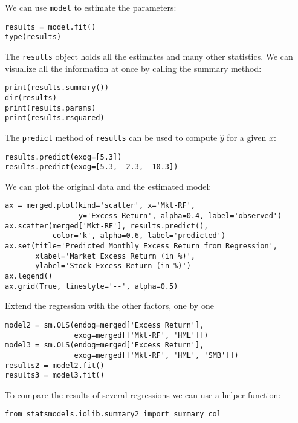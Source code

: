 \documentclass[12pt, a4paper]{article}
\begin{document}
We can use \texttt{model} to estimate the parameters:
\lstset{language=jupyter-python,label= ,caption= ,captionpos=b,numbers=none}
\begin{lstlisting}
results = model.fit()
type(results)
\end{lstlisting}

The \texttt{results} object holds all the estimates and many other statistics.
We can visualize all the information at once by calling the summary method:
\lstset{language=jupyter-python,label= ,caption= ,captionpos=b,numbers=none}
\begin{lstlisting}
print(results.summary())
dir(results)
print(results.params)
print(results.rsquared)
\end{lstlisting}

The \texttt{predict} method of \texttt{results} can be used to compute \(\hat{y}\) for a given \(x\):
\lstset{language=jupyter-python,label= ,caption= ,captionpos=b,numbers=none}
\begin{lstlisting}
results.predict(exog=[5.3])
results.predict(exog=[5.3, -2.3, -10.3])
\end{lstlisting}

We can plot the original data and the estimated model:
\lstset{language=jupyter-python,label= ,caption= ,captionpos=b,numbers=none}
\begin{lstlisting}
ax = merged.plot(kind='scatter', x='Mkt-RF',
                 y='Excess Return', alpha=0.4, label='observed')
ax.scatter(merged['Mkt-RF'], results.predict(),
           color='k', alpha=0.6, label='predicted')
ax.set(title='Predicted Monthly Excess Return from Regression',
       xlabel='Market Excess Return (in %)',
       ylabel='Stock Excess Return (in %)')
ax.legend()
ax.grid(True, linestyle='--', alpha=0.5)
\end{lstlisting}

Extend the regression with the other factors, one by one
\lstset{language=jupyter-python,label= ,caption= ,captionpos=b,numbers=none}
\begin{lstlisting}
model2 = sm.OLS(endog=merged['Excess Return'],
                exog=merged[['Mkt-RF', 'HML']])
model3 = sm.OLS(endog=merged['Excess Return'],
                exog=merged[['Mkt-RF', 'HML', 'SMB']])
results2 = model2.fit()
results3 = model3.fit()
\end{lstlisting}

To compare the results of several regressions we can use a helper function:
\lstset{language=jupyter-python,label= ,caption= ,captionpos=b,numbers=none}
\begin{lstlisting}
from statsmodels.iolib.summary2 import summary_col
\end{lstlisting}
\end{document}
